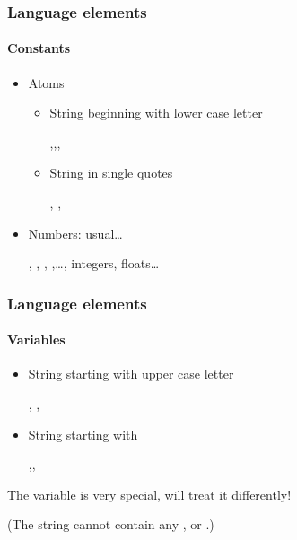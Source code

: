



\begin{frame}[t]
\frametitle{Language elements}
\framesubtitle{Constants}
	\begin{itemize}
		\item Atoms
			\begin{itemize}
			\item \footnotesize String beginning with lower case letter
            \begin{center} ,\quad {},\quad {},\quad {}\end{center}
			\item \footnotesize String in single quotes
\begin{center}
  , \quad {},\quad  {}
\end{center}
			\end{itemize}
		\item Numbers: usual\dots
\begin{center} , , , ,\dots, integers, floats\dots\end{center}
	\end{itemize}
	
\end{frame}



\begin{frame}[t]
\frametitle{Language elements}
\framesubtitle{Variables}
		\begin{itemize}
		\item String starting with upper case letter
            \begin{center}, \quad {},\quad {} \end{center}
		\item String starting with
            \begin{center}\ol{\_},\quad {},\quad {} \end{center}
		\end{itemize}
The variable \ol{\_} is very special, \prolog will treat it differently!

(The string cannot contain any \ol{(}, \ol{)} or \ol{~}.)
\end{frame}

